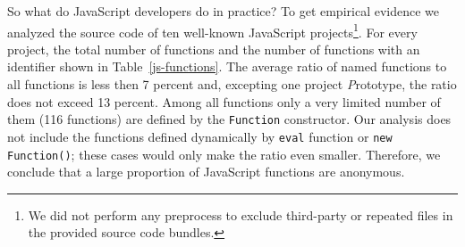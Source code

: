 \documentclass[10pt, preprint]{sigplanconf}
\begin{document}
\begin{table}%

\centering
{}
\caption{The total number of functions and the number of named functions (and percent named)  in ten large JavaScript projects. See appendix 1 for the project citations.} 
\label{js-functions} 
\end{table} 


So what do JavaScript developers do in practice?  To get empirical evidence we analyzed the source code of ten well-known JavaScript projects\footnote[2]{We did not perform any preprocess to exclude third-party or repeated files in the provided source code bundles.}. For every project, the total number of functions and the number of functions with an identifier shown in Table~\ref{js-functions}. The average ratio of named functions to all functions is less then 7 percent and, excepting one project {\textit Prototype}, the ratio does not exceed 13 percent. Among all functions only a very limited number of them (116 functions) are defined by the \verb|Function| constructor. Our analysis does not include the functions defined dynamically by \verb|eval| function or \verb|new Function()|; these cases would only make the ratio even smaller.  Therefore, we conclude that a large proportion of JavaScript functions are anonymous.
\end{document}
